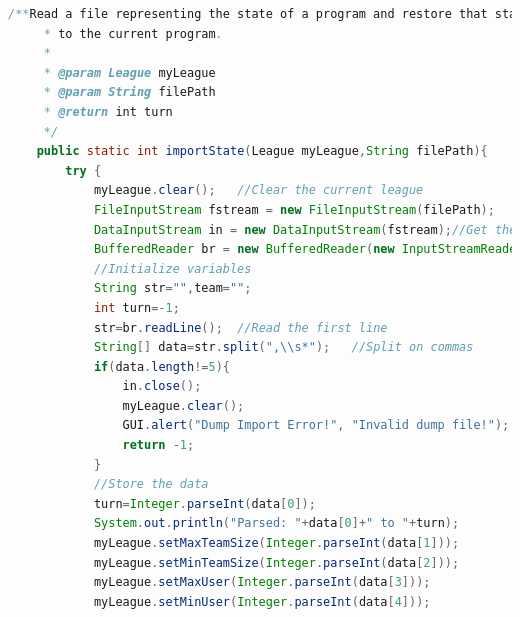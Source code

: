 \documentclass[12pt]{report}
\begin{document}
\begin{singlespace}
\begin{lstlisting}[language=Java,label=some-code,caption={IOManager.java}]
	/**Read a file representing the state of a program and restore that state
	 * to the current program.
	 * 
	 * @param League myLeague
	 * @param String filePath
	 * @return int turn
	 */
	public static int importState(League myLeague,String filePath){
		try {
			myLeague.clear();	//Clear the current league
			FileInputStream fstream = new FileInputStream(filePath);	//Open the file
			DataInputStream in = new DataInputStream(fstream);//Get the object of DataInputStream
			BufferedReader br = new BufferedReader(new InputStreamReader(in));	//Initialize the buffered reader
			//Initialize variables
			String str="",team="";
			int turn=-1;
			str=br.readLine();	//Read the first line
			String[] data=str.split(",\\s*");	//Split on commas
			if(data.length!=5){
				in.close();
				myLeague.clear();
				GUI.alert("Dump Import Error!", "Invalid dump file!");
				return -1;
			}
			//Store the data
			turn=Integer.parseInt(data[0]);
			System.out.println("Parsed: "+data[0]+" to "+turn);
			myLeague.setMaxTeamSize(Integer.parseInt(data[1]));
			myLeague.setMinTeamSize(Integer.parseInt(data[2]));
			myLeague.setMaxUser(Integer.parseInt(data[3]));
			myLeague.setMinUser(Integer.parseInt(data[4]));
			

\end{lstlisting}
\end{singlespace}
\end{document}
